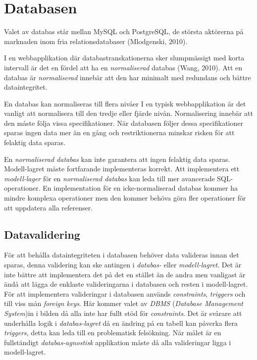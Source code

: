 \section{Databasen}\label{sec:databasen}

Valet av databas står mellan MySQL och PostgreSQL, de största aktörerna på marknaden inom fria relationsdatabaser (Mlodgenski, 2010).

I en webbapplikation där databastranskationerna sker slumpmässigt 
med korta intervall är det en fördel att ha en \emph{normaliserad} databas (Wang, 2010). 
Att en databas är \emph{normaliserad} innebär att den har minimalt med redundans och bättre dataintegritet.

En databas kan normaliseras till flera nivåer I en typisk webbapplikation är det vanligt att
normalisera till den tredje eller fjärde nivån. 
Normalisering innebär att den måste följa vissa specifikationer. 
När databasen följer dessa specifikationer sparas ingen data mer än en gång 
och restriktionerna minskar risken för att  felaktig data sparas.

En \emph{normaliserad databas} kan inte garantera att ingen felaktig data sparas. Modell-lagret måste fortfarande implementeras korrekt. Att implementera ett \emph{modell-lager} för en \emph{normaliserad databas} kan leda till mer avancerade SQL-operationer. En implementation för en icke-normaliserad databas kommer ha mindre komplexa operationer men den kommer behöva göra fler operationer för att uppdatera alla referenser.

\subsection{Datavalidering}
För att behålla dataintegriteten i databasen behöver data valideras innan det sparas, denna validering kan ske antingen i \emph{databas-} eller \emph{modell-lagret}.
Det är inte bättre att implementera det på det en stället än de andra men vanligast är ändå att lägga de enklaste valideringarna i databasen och resten i modell-lagret. För att implementera valideringar i databasen används \emph{constraints}, \emph{triggers} och till viss mån \emph{foreign keys}. Här kommer valet av \emph{DBMS} (\emph{Database Management System})in i bilden då alla inte har fullt stöd för \emph{constraints}.
Det är svårare att underhålla logik i \emph{databas-lagret} då en ändring på en tabell kan påverka flera \emph{triggers}, detta kan leda till en problematisk felsökning.
När målet är en fullständigt \emph{databas-agnostisk} applikation måste då alla valideringar ligga i modell-lagret. 


